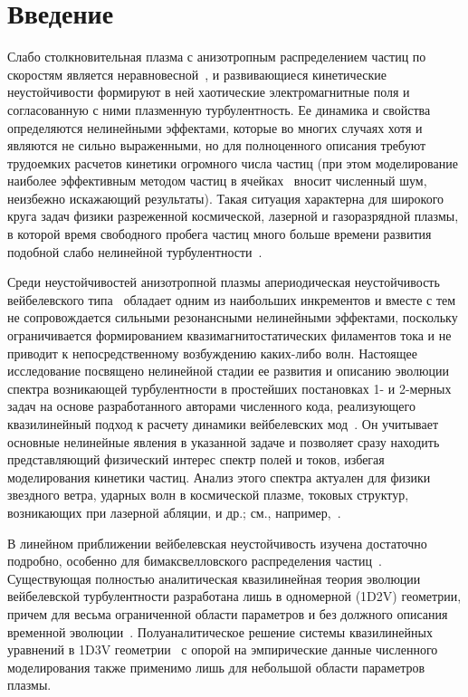 \chapter*{Введение}                         %
Слабо столкновительная плазма с анизотропным распределением частиц по скоростям является неравновесной~\cite{Mikhailovsky1971,Krall1975}, и развивающиеся кинетические неустойчивости формируют в ней хаотические электромагнитные поля и согласованную с ними плазменную турбулентность. Ее динамика и свойства определяются нелинейными эффектами, которые во многих случаях хотя и являются не сильно выраженными, но для полноценного описания требуют трудоемких расчетов кинетики огромного числа частиц (при этом моделирование наиболее эффективным методом частиц в ячейках~\cite{Kato2005,Borodachev2010,Ruyer2015,Lazar2022,Borodachev2016_Radiofiz,Romanov2004} вносит численный шум, неизбежно искажающий результаты). Такая ситуация характерна для широкого круга задач физики разреженной космической, лазерной и газоразрядной плазмы, в которой время свободного пробега частиц много больше времени развития подобной слабо нелинейной турбулентности~\cite{Baumjohann2012,Treumann2009,Marcowith2016,Gary1993}. 

Среди неустойчивостей анизотропной плазмы апериодическая неустойчивость вейбелевского типа~\cite{Weibel1959,Zhou2022,Fried1959,Kalman1968,Morse1971,Kocharovsky2016,Lazar2006,Stockem2009,SchaeferRolffs2006} обладает одним из наибольших инкрементов и вместе с тем не сопровождается сильными резонансными нелинейными эффектами, поскольку ограничивается формированием квазимагнитостатических филаментов тока и не приводит к непосредственному возбуждению каких-либо волн. Настоящее исследование посвящено нелинейной стадии ее развития и описанию эволюции спектра возникающей турбулентности в простейших постановках 1- и 2-мерных задач на основе разработанного авторами численного кода, реализующего квазилинейный подход к расчету динамики вейбелевских мод~\cite{Kuznetsov2022}. Он учитывает основные нелинейные явления в указанной задаче и позволяет сразу находить представляющий физический интерес спектр полей и токов, избегая моделирования кинетики частиц. Анализ этого спектра актуален для физики звездного ветра, ударных волн в космической плазме, токовых структур, возникающих при лазерной абляции, и др.; см., например,~\cite{Lazar2022,Romanov2004,Medvedev2005,Chatterjee2017}.

В линейном приближении вейбелевская неустойчивость изучена достаточно подробно, особенно для бимаксвелловского распределения частиц~\cite{Weibel1959,Fried1959,Vagin2014}. Существующая полностью аналитическая квазилинейная теория эволюции вейбелевской турбулентности разработана лишь в одномерной (1D2V) геометрии, причем для весьма ограниченной области параметров и без должного описания временной эволюции~\cite{Pokhotelov2011}. Полуаналитическое решение системы квазилинейных уравнений в 1D3V геометрии~\cite{Ruyer2015} с опорой на эмпирические данные численного моделирования также применимо лишь для небольшой области параметров плазмы. 

